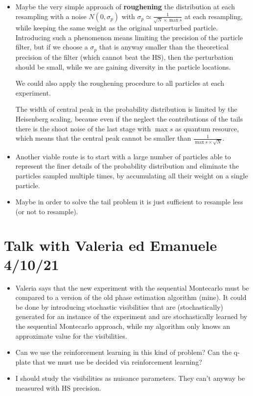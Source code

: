 \documentclass[aps, pra, 10pt, twocolumn, superscriptaddress,floatfix]{revtex4-1}
\begin{document}
\begin{itemize}
	 \item Maybe the very simple approach of \textbf{roughening} the distribution at each resampling with a noise $N(0, \sigma_p)$ with $\sigma_p \simeq \frac{1}{\sqrt{N} \times \max{s}}$ at each resampling, while keeping the same weight as the original unperturbed particle. Introducing such a phenomenon means limiting the precision of the particle filter, but if we choose a $\sigma_p$ that is anyway smaller than the theoretical precision of the filter (which cannot beat the HS), then the perturbation should be small, while we are gaining diversity in the particle locations.
	 
	 We could also apply the roughening procedure to all particles at each experiment.
	 
	 The width of central peak in the probability distribution is limited by the Heisenberg scaling, because even if the neglect the contributions of the tails there is the shoot noise of the last stage with $\max{s}$ as quantum resource, which means that the central peak cannot be smaller than $\frac{1}{\max{s} \times \sqrt{N}}$.
	 
	 \item Another viable route is to start with a large number of particles able to represent the finer details of the probability distribution and eliminate the particles sampled multiple times, by accumulating all their weight on a single particle.
	 
	 \item Maybe in order to solve the tail problem it is just sufficient to resample less (or not to resample).	 
	
\end{itemize}

\section{Talk with Valeria ed Emanuele 4/10/21}

\begin{itemize}
	
	\item Valeria says that the new experiment with the sequential Montecarlo must be compared to a version of the old phase estimation algorithm (mine). It could be done by introducing stochastic visibilities that are (stochastically) generated for an instance of the experiment and are stochastically learned by the sequential Montecarlo approach, while my algorithm only knows an approximate value for the visibilities.
	
	\item Can we use the reinforcement learning in this kind of problem? Can the q-plate that we must use be decided via reinforcement learning?
	
	\item I should study the visibilities as nuisance parameters. They can't anyway be measured with HS precision.
	
\end{itemize}
\end{document}
